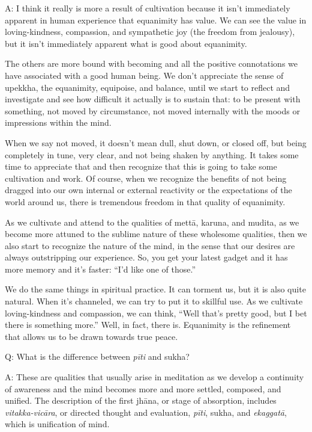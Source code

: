 \vspace{\the\qaskip}
A: I think it really is more a result of cultivation because it isn’t
immediately apparent in human experience that equanimity has value. We
can see the value in loving-kindness, compassion, and sympathetic joy
(the freedom from jealousy), but it isn’t immediately apparent what is
good about equanimity.

The others are more bound with becoming and all the positive
connotations we have associated with a good human being. We don’t
appreciate the sense of upekkha, the equanimity, equipoise, and balance,
until we start to reflect and investigate and see how difficult it
actually is to sustain that: to be present with something, not moved by
circumstance, not moved internally with the moods or impressions within
the mind.

When we say not moved, it doesn’t mean dull, shut down, or closed off,
but being completely in tune, very clear, and not being shaken by
anything. It takes some time to appreciate that and then recognize that
this is going to take some cultivation and work. Of course, when we
recognize the benefits of not being dragged into our own internal or
external reactivity or the expectations of the world around us, there is
tremendous freedom in that quality of equanimity.

As we cultivate and attend to the qualities of mettā, karuna, and
mudita, as we become more attuned to the sublime nature of these
wholesome qualities, then we also start to recognize the nature of the
mind, in the sense that our desires are always outstripping our
experience. So, you get your latest gadget and it has more memory and
it’s faster: “I’d like one of those.”

We do the same things in spiritual practice. It can torment us, but it
is also quite natural. When it’s channeled, we can try to put it to
skillful use. As we cultivate loving-kindness and compassion, we can
think, “Well that’s pretty good, but I bet there is something more.”
Well, in fact, there is. Equanimity is the refinement that allows us to
be drawn towards true peace.

\vspace{\the\qaskip}
Q: What is the difference between \emph{pīti} and sukha?

\vspace{\the\qaskip}
A: These are qualities that usually arise in meditation as we develop a
continuity of awareness and the mind becomes more and more settled,
composed, and unified. The description of the first jhāna, or stage of
absorption, includes \emph{vitakka-vicāra}, or directed thought and
evaluation, \emph{pīti}, sukha, and \emph{ekaggatā}, which is
unification of mind.

